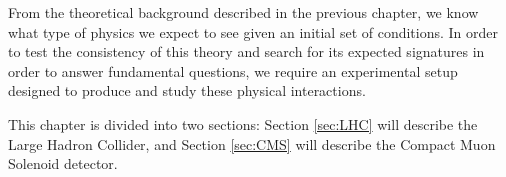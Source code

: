 From the theoretical background described in the previous chapter, we know what type of physics we expect to see given an initial set of conditions. In order to test the consistency of this theory and search for its expected signatures in order to answer fundamental questions, we require an experimental setup designed to produce and study these physical interactions. 

This chapter is divided into two sections: Section \ref{sec:LHC} will describe the Large Hadron Collider, and Section \ref{sec:CMS} will describe the Compact Muon Solenoid detector. 


 